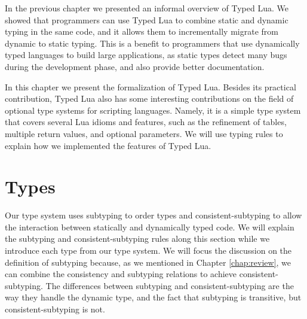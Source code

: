 
In the previous chapter we presented an informal overview of Typed Lua.
We showed that programmers can use Typed Lua to combine static and dynamic
typing in the same code, and it allows them to incrementally migrate from
dynamic to static typing.
This is a benefit to programmers that use dynamically typed languages
to build large applications, as static types detect many bugs
during the development phase, and also provide better documentation.

In this chapter we present the formalization of Typed Lua.
Besides its practical contribution, Typed Lua also has some interesting
contributions on the field of optional type systems for scripting
languages.
Namely, it is a simple type system that covers several Lua idioms
and features, such as the refinement of tables, multiple return values,
and optional parameters.
We will use typing rules to explain how we implemented the features of Typed Lua.

\section{Types}

Our type system uses subtyping \citep{cardelli1984smi,abadi1996to} to order
types and consistent-subtyping \citep{siek2007objects,siek2013mutable}
to allow the interaction between statically and dynamically typed code.
We will explain the subtyping and consistent-subtyping rules along this
section while we introduce each type from our type system.
We will focus the discussion on the definition of subtyping because,
as we mentioned in Chapter \ref{chap:review}, we can combine the
consistency and subtyping relations to achieve consistent-subtyping.
The differences between subtyping and consistent-subtyping are the way
they handle the dynamic type, and the fact that subtyping is transitive,
but consistent-subtyping is not.

